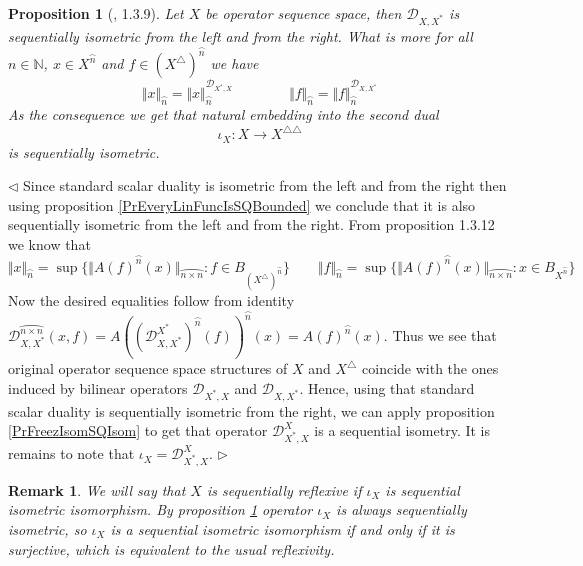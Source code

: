 \documentclass[12pt]{article}
\newtheorem{proposition}[theorem]{Proposition}
\newtheorem{remark}[theorem]{Remark}
\newenvironment{proof}{\par $\triangleleft$}{$\triangleright$}
\begin{document}
\begin{proposition}[\cite{LamOpFolgen}, 1.3.9]\label{PrSQNormsViaDuality}
Let $X$ be operator sequence space, then $\mathcal{D}_{X,X^*}$ is sequentially isometric from the left and from the right. What is more for all $n\in\mathbb{N}$, $x\in X^{\wideparen{n}}$ and $f\in (X^\triangle)^{\wideparen{n}}$ we have
$$
\Vert x\Vert_{\wideparen{n}}
=\Vert x\Vert_{\wideparen{n}}^{\mathcal{D}_{X^*,X}}
\qquad\qquad
\Vert f\Vert_{\wideparen{n}}
=\Vert f\Vert_{\wideparen{n}}^{\mathcal{D}_{X,X^*}}
$$
As the consequence we get that natural embedding into the second dual
$$
\iota_X:X\to X^{\triangle\triangle}
$$
is sequentially isometric.
\end{proposition}
\begin{proof}
Since standard scalar duality is isometric from the left and from the right then using proposition \ref{PrEveryLinFuncIsSQBounded} we conclude that it is also sequentially isometric from the left and from the right. From proposition 1.3.12 \cite{LamOpFolgen} we know that
$$
\Vert x\Vert_{\wideparen{n}}
=\sup\{\Vert A(f)^{\wideparen{n}}(x)\Vert_{\wideparen{n\times n}}: f\in B_{(X^\triangle)^{\wideparen{n}}}\}
\qquad
\Vert f\Vert_{\wideparen{n}}
=\sup\{\Vert A(f)^{\wideparen{n}}(x)\Vert_{\wideparen{n\times n}}:x\in B_{X^{\wideparen{n}}}\}
$$
Now the desired equalities follow from identity $\mathcal{D}_{X,X^*}^{\wideparen{n\times n}}(x,f)=A((\mathcal{D}_{X,X^*}^{X^*})^{\wideparen{n}}(f))^{\wideparen{n}}(x)
=A(f)^{\wideparen{n}}(x)$.
Thus we see that original operator sequence space structures of $X$ and $X^\triangle$ coincide with the ones induced by bilinear operators $\mathcal{D}_{X^*,X}$ and $\mathcal{D}_{X,X^*}$. Hence, using that standard scalar duality is sequentially isometric from the right, we can apply proposition  \ref{PrFreezIsomSQIsom} to get that operator $\mathcal{D}_{X^*,X}^X$ is a sequential isometry. It is remains to note that $\iota_X=\mathcal{D}_{X^*,X}^X$. 
\end{proof}

\begin{remark}\label{RemSqReflexiv} We will say that $X$ is sequentially reflexive if $\iota_X$ is sequential isometric isomorphism. By proposition \ref{PrSQNormsViaDuality} operator $\iota_X$ is always sequentially isometric, so $\iota_X$ is a sequential isometric isomorphism if and only if it is surjective, which is equivalent to the usual reflexivity.
\end{remark}
\end{document}
